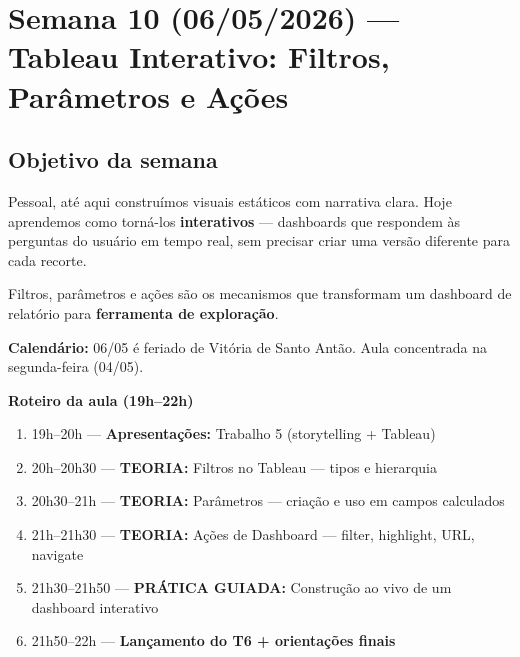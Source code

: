 
\chapter{Semana 10 (06/05/2026) — Tableau Interativo: Filtros, Parâmetros e Ações}

\section{Objetivo da semana}

Pessoal, até aqui construímos visuais estáticos com narrativa clara.
Hoje aprendemos como torná-los \textbf{interativos} — dashboards que
respondem às perguntas do usuário em tempo real, sem precisar criar uma
versão diferente para cada recorte.

Filtros, parâmetros e ações são os mecanismos que transformam um dashboard
de relatório para \textbf{ferramenta de exploração}.

\begin{NoteBox}
\textbf{Calendário:} 06/05 é feriado de Vitória de Santo Antão.
Aula concentrada na segunda-feira (04/05).
\end{NoteBox}

\begin{BoardBox}
\textbf{Roteiro da aula (19h–22h)}
\begin{enumerate}
  \item 19h–20h — \textbf{Apresentações:} Trabalho 5 (storytelling + Tableau)
  \item 20h–20h30 — \textbf{TEORIA:} Filtros no Tableau — tipos e hierarquia
  \item 20h30–21h — \textbf{TEORIA:} Parâmetros — criação e uso em campos calculados
  \item 21h–21h30 — \textbf{TEORIA:} Ações de Dashboard — filter, highlight, URL, navigate
  \item 21h30–21h50 — \textbf{PRÁTICA GUIADA:} Construção ao vivo de um dashboard interativo
  \item 21h50–22h — \textbf{Lançamento do T6 + orientações finais}
\end{enumerate}
\end{BoardBox}

